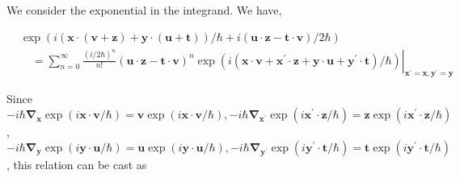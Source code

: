 \documentclass{article}
\begin{document}
We consider the exponential in the integrand. We have,
 
\begin{align*}
& \exp (i(\boldsymbol{x} \cdot(\boldsymbol{v}+\boldsymbol{z})+\boldsymbol{y} \cdot(\boldsymbol{u}+\boldsymbol{t})) / \hbar+i(\boldsymbol{u} \cdot \boldsymbol{z}-\boldsymbol{t} \cdot \boldsymbol{v}) / 2 \hbar)  \tag{3.7.41}\\
& \quad=\left.\sum_{n=0}^{\infty} \frac{(i / 2 \hbar)^{n}}{n!}(\boldsymbol{u} \cdot \boldsymbol{z}-\boldsymbol{t} \cdot \boldsymbol{v})^{n} \exp \left(i\left(\boldsymbol{x} \cdot \boldsymbol{v}+\boldsymbol{x}^{\prime} \cdot \boldsymbol{z}+\boldsymbol{y} \cdot \boldsymbol{u}+\boldsymbol{y}^{\prime} \cdot \boldsymbol{t}\right) / \hbar\right)\right|_{\boldsymbol{x}^{\prime}=\boldsymbol{x}, \boldsymbol{y}^{\prime}=\boldsymbol{y}}
\end{align*}
 

Since $-i \hbar \boldsymbol{\nabla}_{\boldsymbol{x}} \exp (i \boldsymbol{x} \cdot \boldsymbol{v} / \hbar)=\boldsymbol{v} \exp (i \boldsymbol{x} \cdot \boldsymbol{v} / \hbar),-i \hbar \boldsymbol{\nabla}_{\boldsymbol{x}^{\prime}} \exp \left(i \boldsymbol{x}^{\prime} \cdot \boldsymbol{z} / \hbar\right)=\boldsymbol{z} \exp \left(i \boldsymbol{x}^{\prime} \cdot \boldsymbol{z} / \hbar\right)$, $-i \hbar \boldsymbol{\nabla}_{\boldsymbol{y}} \exp (i \boldsymbol{y} \cdot \boldsymbol{u} / \hbar)=\boldsymbol{u} \exp (i \boldsymbol{y} \cdot \boldsymbol{u} / \hbar),-i \hbar \boldsymbol{\nabla}_{\boldsymbol{y}^{\prime}} \exp \left(i \boldsymbol{y}^{\prime} \cdot \boldsymbol{t} / \hbar\right)=\boldsymbol{t} \exp \left(i \boldsymbol{y}^{\prime} \cdot \boldsymbol{t} / \hbar\right)$, this relation can be cast as
 
\end{document}

